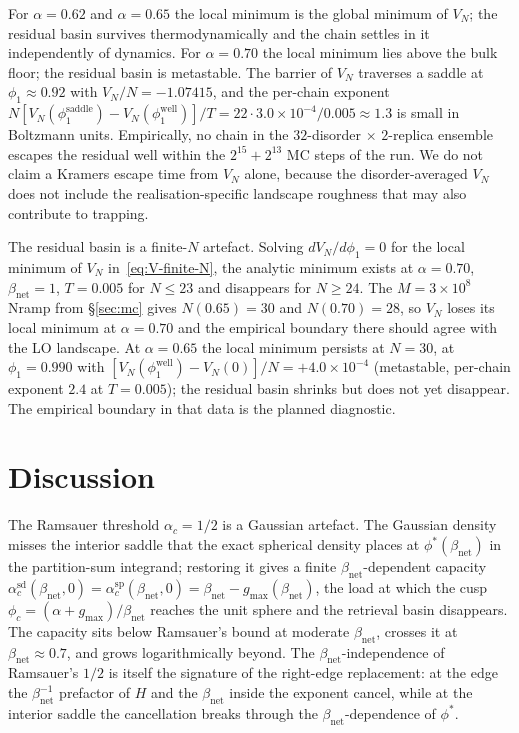 \documentclass[11pt]{article}
\newcommand{\Bnet}{\beta_{\mathrm{net}}}
\newcommand{\gmax}{g_{\max}}
\newcommand{\acSd}{\alpha_c^{\mathrm{sd}}}
\newcommand{\acSp}{\alpha_c^{\mathrm{sp}}}
\begin{document}
For $\alpha = 0.62$ and $\alpha = 0.65$ the local minimum is the global
minimum of $V_N$; the residual basin survives thermodynamically and the
chain settles in it independently of dynamics.  For $\alpha = 0.70$ the
local minimum lies above the bulk floor; the residual basin is metastable.
The barrier of $V_N$ traverses a saddle at $\phi_1 \approx 0.92$ with
$V_N/N = -1.07415$, and the per-chain exponent
$N[V_N(\phi_1^{\mathrm{saddle}}) - V_N(\phi_1^{\mathrm{well}})]/T = 22 \cdot
3.0 \times 10^{-4} / 0.005 \approx 1.3$ is small in Boltzmann units.
Empirically, no chain in the $32$-disorder $\times$ $2$-replica ensemble
escapes the residual well within the $2^{15} + 2^{13}$ MC steps of the run.
We do not claim a Kramers escape time from $V_N$ alone, because the
disorder-averaged $V_N$ does not include the realisation-specific landscape
roughness that may also contribute to trapping.

The residual basin is a finite-$N$ artefact.  Solving $dV_N/d\phi_1 = 0$
for the local minimum of $V_N$ in~\eqref{eq:V-finite-N}, the analytic
minimum exists at $\alpha = 0.70$, $\Bnet = 1$, $T = 0.005$ for
$N \le 23$ and disappears for $N \ge 24$.  The $M = 3 \times 10^8$ Nramp
from \S\ref{sec:mc} gives $N(0.65) = 30$ and $N(0.70) = 28$, so $V_N$
loses its local minimum at $\alpha = 0.70$ and the empirical boundary
there should agree with the LO landscape.  At $\alpha = 0.65$ the local
minimum persists at $N = 30$, at $\phi_1 = 0.990$ with
$[V_N(\phi_1^{\mathrm{well}}) - V_N(0)]/N = +4.0 \times 10^{-4}$
(metastable, per-chain exponent $2.4$ at $T = 0.005$); the residual basin
shrinks but does not yet disappear.  The empirical boundary in that data
is the planned diagnostic.

\section{Discussion}
\label{sec:discussion}

The Ramsauer threshold $\alpha_c = 1/2$ is a Gaussian artefact.  The
Gaussian density misses the interior saddle that the exact spherical
density places at $\phi^{*}(\Bnet)$ in the partition-sum integrand;
restoring it gives a finite $\Bnet$-dependent capacity
$\acSd(\Bnet, 0) = \acSp(\Bnet, 0) = \Bnet - \gmax(\Bnet)$, the load
at which the cusp $\phi_c = (\alpha + \gmax)/\Bnet$ reaches the
unit sphere and the retrieval basin disappears.  The capacity sits
below Ramsauer's bound at moderate $\Bnet$, crosses it at
$\Bnet \approx 0.7$, and grows logarithmically beyond.  The
$\Bnet$-independence of Ramsauer's $1/2$ is itself the signature of the
right-edge replacement: at the edge the $\Bnet^{-1}$ prefactor of $H$
and the $\Bnet$ inside the exponent cancel, while at the interior
saddle the cancellation breaks through the $\Bnet$-dependence of
$\phi^{*}$.
\end{document}
